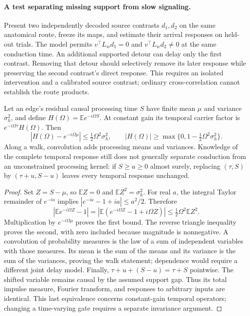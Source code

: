 \paragraph{A test separating missing support from slow signaling.} Present two independently decoded source contrasts $d_1,d_2$ on the same anatomical route, freeze its maps, and estimate their arrival responses on held-out trials. The model permits $v^\top L_wd_1=0$ and $v^\top L_wd_2\ne0$ at the same conduction time. An additional supported detour can delay only the first contrast. Removing that detour should selectively remove its later response while preserving the second contrast's direct response. This requires an isolated intervention and a calibrated source contrast; ordinary cross-correlation cannot establish the route products.

\begin{proposition}\label{prop:dispersion}
Let an edge's residual causal processing time $S$ have finite mean $\mu$ and variance $\sigma_h^2$, and define $H(\Omega)=\mathbb E e^{-i\Omega S}$. At constant gain its temporal carrier factor is $e^{-i\Omega\tau}H(\Omega)$. Then
\begin{equation}
 |H(\Omega)-e^{-i\Omega\mu}|\le\tfrac12\Omega^2\sigma_h^2,
 \qquad |H(\Omega)|\ge\max\{0,1-\tfrac12\Omega^2\sigma_h^2\}.
\label{eq:dispersion-bound}
\end{equation}
Along a walk, convolution adds processing means and variances. Knowledge of the complete temporal response still does not generally separate conduction from an unconstrained processing kernel: if $S\ge u\ge0$ almost surely, replacing $(\tau,S)$ by $(\tau+u,S-u)$ leaves every temporal response unchanged.
\end{proposition}
\begin{proof}
Set $Z=S-\mu$, so $\mathbb EZ=0$ and $\mathbb EZ^2=\sigma_h^2$. For real $a$, the integral Taylor remainder of $e^{-ia}$ implies $|e^{-ia}-1+ia|\le a^2/2$. Therefore
\[
 |\mathbb E e^{-i\Omega Z}-1|
 =|\mathbb E(e^{-i\Omega Z}-1+i\Omega Z)|
 \le\tfrac12\Omega^2\mathbb EZ^2.
\]
Multiplication by $e^{-i\Omega\mu}$ proves the first bound. The reverse triangle inequality proves the second, with zero included because magnitude is nonnegative. A convolution of probability measures is the law of a sum of independent variables with those measures. Its mean is the sum of the means and its variance is the sum of the variances, proving the walk statement; dependence would require a different joint delay model. Finally, $\tau+u+(S-u)=\tau+S$ pointwise. The shifted variable remains causal by the assumed support gap. Thus its total impulse measure, Fourier transform, and responses to arbitrary inputs are identical. This last equivalence concerns constant-gain temporal operators; changing a time-varying gate requires a separate invariance argument.
\end{proof}

